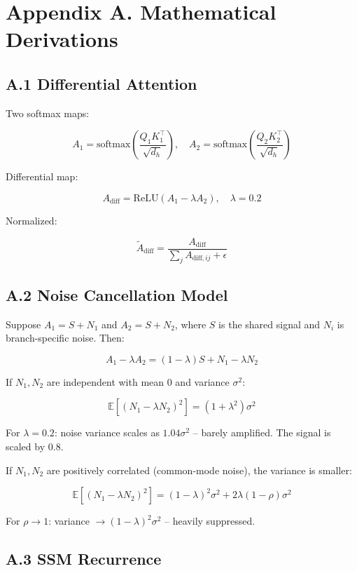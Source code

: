 \section{Appendix A. Mathematical Derivations}

\subsection{A.1 Differential Attention}

Two softmax maps:

\[
A_1 = \text{softmax}\!\left(\frac{Q_1 K_1^\top}{\sqrt{d_h}}\right), \quad
A_2 = \text{softmax}\!\left(\frac{Q_2 K_2^\top}{\sqrt{d_h}}\right)
\tag{A.1}
\]

Differential map:

\[
A_\text{diff} = \text{ReLU}(A_1 - \lambda A_2), \quad \lambda = 0.2
\tag{A.2}
\]

Normalized:

\[
\tilde{A}_\text{diff} = \frac{A_\text{diff}}{\sum_j A_{\text{diff}, ij} + \epsilon}
\tag{A.3}
\]

\subsection{A.2 Noise Cancellation Model}

Suppose $A_1 = S + N_1$ and $A_2 = S + N_2$, where $S$ is the shared 
signal and $N_i$ is branch-specific noise. Then:

\[
A_1 - \lambda A_2 = (1 - \lambda) S + N_1 - \lambda N_2
\tag{A.4}
\]

If $N_1, N_2$ are independent with mean 0 and variance $\sigma^2$:

\[
\mathbb{E}[(N_1 - \lambda N_2)^2] = (1 + \lambda^2) \sigma^2
\tag{A.5}
\]

For $\lambda = 0.2$: noise variance scales as $1.04 \sigma^2$ -- barely 
amplified. The signal is scaled by $0.8$.

If $N_1, N_2$ are positively correlated (common-mode noise), the variance 
is smaller:

\[
\mathbb{E}[(N_1 - \lambda N_2)^2] = (1 - \lambda)^2 \sigma^2 + 2\lambda(1 - \rho) \sigma^2
\tag{A.6}
\]

For $\rho \to 1$: variance $\to (1 - \lambda)^2 \sigma^2$ -- heavily 
suppressed.

\subsection{A.3 SSM Recurrence}

